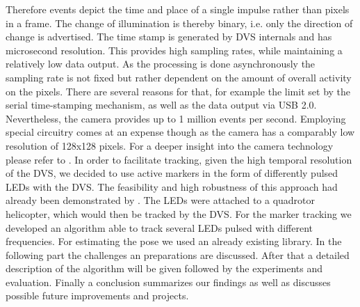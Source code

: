 Therefore events depict the time and place of a single impulse rather than pixels in a frame. The change of illumination is thereby binary, i.e. only the direction of change is advertised. The time stamp is generated by DVS internals and has microsecond resolution. This provides high sampling rates, while maintaining a relatively low data output. As the processing is done asynchronously the sampling rate is not fixed but rather dependent on the amount of overall activity on the pixels. There are several reasons for that, for example the limit set by the serial time-stamping mechanism, as well as the data output via USB 2.0. Nevertheless, the camera provides up to 1 million events per second. Employing special circuitry comes at an expense though as the camera has a comparably low resolution of 128x128 pixels. For a deeper insight into the camera technology please refer to \cite{DVS}.
In order to facilitate tracking, given the high temporal resolution of the DVS, we decided to use active markers in the form of differently pulsed LEDs with the DVS. The feasibility and high robustness of this approach had already been demonstrated by \cite{Matthias}. The LEDs were attached to a quadrotor helicopter, which would then be tracked by the DVS.  For the marker tracking we developed an algorithm able to track several LEDs pulsed with different frequencies. For estimating the pose we used an already existing library. In the following part the challenges an preparations are discussed. After that a detailed description of the algorithm will be given followed by the experiments and evaluation. Finally a conclusion summarizes our findings as well as discusses possible future improvements and projects.
